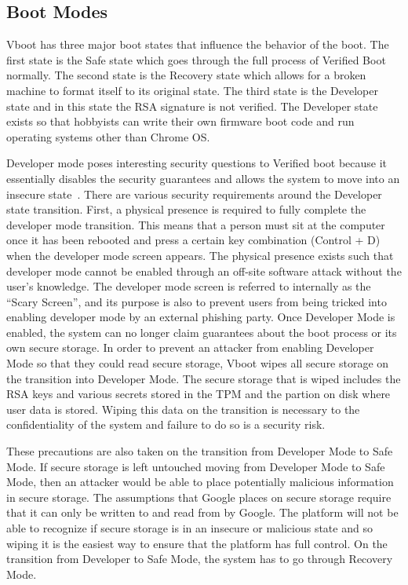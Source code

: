 \documentclass[../report.tex]{subfiles}
\begin{document}
\subsection{Boot Modes}\label{sec:boot-modes}

Vboot has three major boot states that influence the behavior of the boot. 
The first state is the Safe state which goes through the full process of Verified Boot normally.
The second state is the Recovery state which allows for a broken machine to format itself to its original state.
The third state is the Developer state and in this state the RSA signature is not verified.
The Developer state exists so that hobbyists can write their own firmware boot code and run operating systems other than Chrome OS\@.

Developer mode poses interesting security questions to Verified boot because it essentially disables the security guarantees and allows the system to move into an insecure state~\cite{developer-mode}. 
There are various security requirements around the Developer state transition.
First, a physical presence is required to fully complete the developer mode transition. 
This means that a person must sit at the computer once it has been rebooted and press a certain key combination (Control + D) when the developer mode screen appears.
The physical presence exists such that developer mode cannot be enabled through an off-site software attack without the user's knowledge.
The developer mode screen is referred to internally as the ``Scary Screen'', and its purpose is also to prevent users from being tricked into enabling developer mode by an external phishing party.
Once Developer Mode is enabled, the system can no longer claim guarantees about the boot process or its own secure storage.
In order to prevent an attacker from enabling Developer Mode so that they could read secure storage, Vboot wipes all secure storage on the transition into Developer Mode.
The secure storage that is wiped includes the RSA keys and various secrets stored in the TPM and the partion on disk where user data is stored.
Wiping this data on the transition is necessary to the confidentiality of the system and failure to do so is a security risk.

These precautions are also taken on the transition from Developer Mode to Safe Mode. 
If secure storage is left untouched moving from Developer Mode to Safe Mode, then an attacker would be able to place potentially malicious information in secure storage.
The assumptions that Google places on secure storage require that it can only be written to and read from by Google.
The platform will not be able to recognize if secure storage is in an insecure or malicious state and so wiping it is the easiest way to ensure that the platform has full control.
On the transition from Developer to Safe Mode, the system has to go through Recovery Mode.
\end{document}
